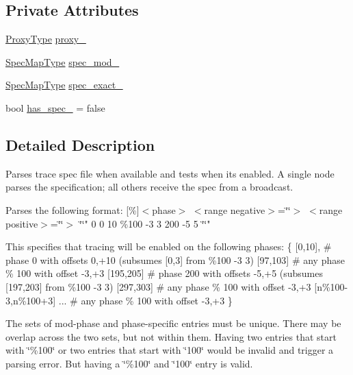 \subsection*{Private Attributes}
\begin{DoxyCompactItemize}
\item 
\hyperlink{structvt_1_1trace_1_1file__spec_1_1_trace_spec_a26160cff9bb5115866943ed823405f1f}{Proxy\+Type} \hyperlink{structvt_1_1trace_1_1file__spec_1_1_trace_spec_a8557ed1c4a94021812b8fbe27e472571}{proxy\+\_\+}
\item 
\hyperlink{structvt_1_1trace_1_1file__spec_1_1_trace_spec_a155d6b881e8d69a4644823789788ce5c}{Spec\+Map\+Type} \hyperlink{structvt_1_1trace_1_1file__spec_1_1_trace_spec_aae4873bc7f4d6ae6c33098670c8a550e}{spec\+\_\+mod\+\_\+}
\item 
\hyperlink{structvt_1_1trace_1_1file__spec_1_1_trace_spec_a155d6b881e8d69a4644823789788ce5c}{Spec\+Map\+Type} \hyperlink{structvt_1_1trace_1_1file__spec_1_1_trace_spec_a70c434aefee7f80b6cccd7a1c561c35a}{spec\+\_\+exact\+\_\+}
\item 
bool \hyperlink{structvt_1_1trace_1_1file__spec_1_1_trace_spec_a06ed36af6eaec1aeef63f81746e162a7}{has\+\_\+spec\+\_\+} = false
\end{DoxyCompactItemize}


\subsection{Detailed Description}
Parses trace spec file when available and tests when its enabled. A single node parses the specification; all others receive the spec from a broadcast. 

Parses the following format\+: \mbox{[}\%\mbox{]}$<$phase$>$ $<$range negative$>$=\char`\"{}\char`\"{}$>$ $<$range positive$>$=\char`\"{}\char`\"{}$>$ \char`\"{}\char`\"{}" 0 0 10 \%100 -\/3 3 200 -\/5 5 \char`\"{}\char`\"{}"

This specifies that tracing will be enabled on the following phases\+: \{ \mbox{[}0,10\mbox{]}, \# phase 0 with offsets 0,+10 (subsumes \mbox{[}0,3\mbox{]} from \%100 -\/3 3) \mbox{[}97,103\mbox{]} \# any phase \% 100 with offset -\/3,+3 \mbox{[}195,205\mbox{]} \# phase 200 with offsets -\/5,+5 (subsumes \mbox{[}197,203\mbox{]} from \%100 -\/3 3) \mbox{[}297,303\mbox{]} \# any phase \% 100 with offset -\/3,+3 \mbox{[}n\%100-\/3,n\%100+3\mbox{]} ... \# any phase \% 100 with offset -\/3,+3 \}

The sets of mod-\/phase and phase-\/specific entries must be unique. There may be overlap across the two sets, but not within them. Having two entries that start with \char`\"{}\%100\char`\"{} or two entries that start with \char`\"{}100\char`\"{} would be invalid and trigger a parsing error. But having a \char`\"{}\%100\char`\"{} and \char`\"{}100\char`\"{} entry is valid.

